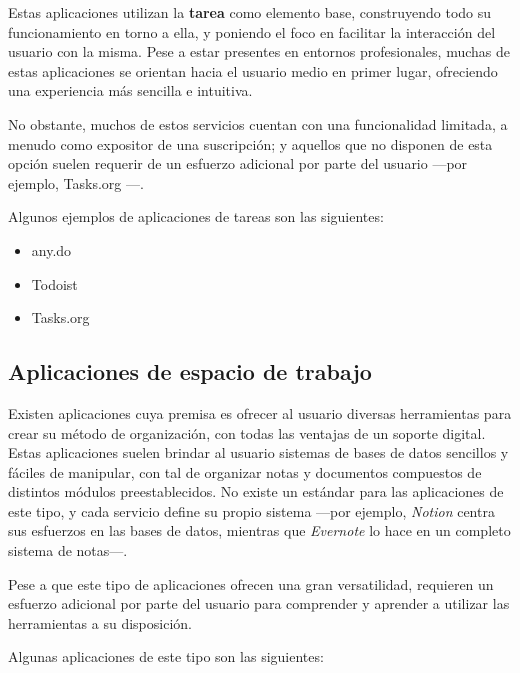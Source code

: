 \documentclass[10pt, a4paper]{aqademic}
\begin{document}
\medskip

Estas aplicaciones utilizan la \textbf{tarea} como elemento base, construyendo todo su funcionamiento en torno a ella, y poniendo el foco en facilitar la interacción del usuario con la misma. Pese a estar presentes en entornos profesionales, muchas de estas aplicaciones se orientan hacia el usuario medio en primer lugar, ofreciendo una experiencia más sencilla e intuitiva.

\medskip

No obstante, muchos de estos servicios cuentan con una funcionalidad limitada, a menudo como expositor de una suscripción; y aquellos que no disponen de esta opción suelen requerir de un esfuerzo adicional por parte del usuario ---por ejemplo, Tasks.org \cite{tasks.org}---.

\medskip

Algunos ejemplos de aplicaciones de tareas son las siguientes:

\begin{itemize}
	\item any.do
	\item Todoist
	\item Tasks.org
\end{itemize}


\subsection*{Aplicaciones de espacio de trabajo}

Existen aplicaciones cuya premisa es ofrecer al usuario diversas herramientas para crear su método de organización, con todas las ventajas de un soporte digital. Estas aplicaciones suelen brindar al usuario sistemas de bases de datos sencillos y fáciles de manipular, con tal de organizar notas y documentos compuestos de distintos módulos preestablecidos. No existe un estándar para las aplicaciones de este tipo, y cada servicio define su propio sistema ---por ejemplo, \textit{Notion} centra sus esfuerzos en las bases de datos, mientras que \textit{Evernote} lo hace en un completo sistema de notas---.

\medskip

Pese a que este tipo de aplicaciones ofrecen una gran versatilidad, requieren un esfuerzo adicional por parte del usuario para comprender y aprender a utilizar las herramientas a su disposición. 

\medskip

Algunas aplicaciones de este tipo son las siguientes:
\end{document}
